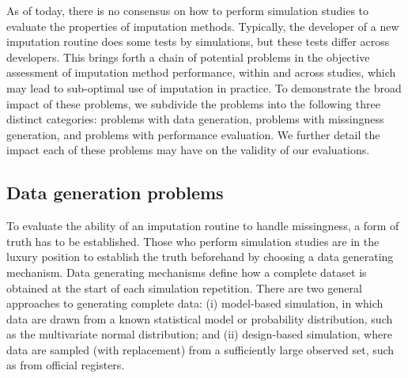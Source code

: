 \documentclass[bimj,fleqn]{w-art}
\begin{document}
As of today, there is no consensus on how to perform simulation studies to evaluate the properties of imputation methods. Typically, the developer of a new imputation routine does some tests by simulations, but these tests differ across developers. This brings forth a chain of potential problems in the objective assessment of imputation method performance, within and across studies, which may lead to sub-optimal use of imputation in practice. To demonstrate the broad impact of these problems, we subdivide the problems into the following three distinct categories: problems with data generation, problems with missingness generation, and problems with performance evaluation. We further detail the impact each of these problems may have on the validity of our evaluations. 


\subsection{Data generation problems}

To evaluate the ability of an imputation routine to handle missingness, a form of truth has to be established. Those who perform simulation studies are in the luxury position to establish the truth beforehand by choosing a data generating mechanism. Data generating mechanisms define how a complete dataset is obtained at the start of each simulation repetition. There are two general approaches to generating complete data: (i) model-based simulation, in which data are drawn from a known statistical model or probability distribution, such as the multivariate normal distribution; and (ii) design-based simulation, where data are sampled (with replacement) from a sufficiently large observed set, such as from official registers.
\end{document}
